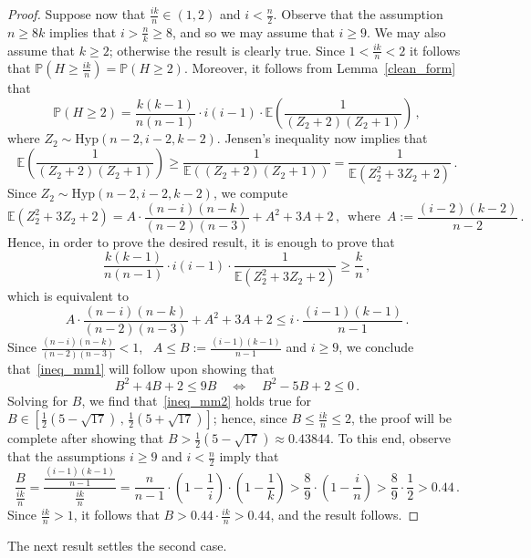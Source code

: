 \documentclass[10pt]{article}
\theoremstyle{plain}
\theoremstyle{definition}
\theoremstyle{remark}
\begin{document}
\begin{proof}
Suppose now that $\frac{ik}{n} \in (1,2)$ and $i<\frac{n}{2}$. 
Observe that the assumption $n\ge 8k$ implies that $i> \frac{n}{k} \ge 8$, and so we may assume that $i\ge 9$. 
We may also assume that $k\ge 2$; otherwise the result is clearly true. 
Since $1<\frac{ik}{n} < 2$ it follows that 
$\mathbb{P}(H \ge \frac{ik}{n})=\mathbb{P}(H\ge 2)$. 
Moreover, it follows from Lemma~\ref{clean_form} that 
\[
\mathbb{P}(H\ge 2) = \frac{k(k-1)}{n(n-1)} \cdot i(i-1)\cdot \mathbb{E}\left(\frac{1}{(Z_2+2)(Z_2+1)}\right) \, ,
\]
where $Z_2\sim\text{Hyp}(n-2,i-2,k-2)$. 
Jensen's inequality now implies that 
\[
\mathbb{E}\left(\frac{1}{(Z_2+2)(Z_2+1)}\right) \ge 
\frac{1}{\mathbb{E}((Z_2+2)(Z_2+1))} = \frac{1}{\mathbb{E}(Z_2^2+3Z_2 +2)} \, .
\]
Since $Z_2\sim\text{Hyp}(n-2,i-2,k-2)$, we compute 
\[
\mathbb{E}(Z_2^2+3Z_2 +2) = A \cdot 
\frac{(n-i)(n-k)}{(n-2)(n-3)} + A^2 + 3A + 2 \, , \, \text{ where } \, A := \frac{(i-2)(k-2)}{n-2} \, .
\]
Hence, in order to prove the desired result, it is enough to prove that 
\[
\frac{k(k-1)}{n(n-1)} \cdot i(i-1)\cdot \frac{1}{\mathbb{E}(Z_2^2+3Z_2 +2)} \ge \frac{k}{n} \, ,
\]
which is equivalent to
\begin{equation}\label{ineq_mm1}
A \cdot 
\frac{(n-i)(n-k)}{(n-2)(n-3)} + A^2 + 3A + 2 \le i\cdot \frac{(i-1)(k-1)}{n-1} \, .
\end{equation}
Since $\frac{(n-i)(n-k)}{(n-2)(n-3)}<1$, \, $A\le B:=\frac{(i-1)(k-1)}{n-1}$ and $i\ge 9$, we conclude that~\eqref{ineq_mm1} will follow upon showing that 
\begin{equation}\label{ineq_mm2}
B^2 +4B + 2 \le 9B \quad \Longleftrightarrow\quad B^2-5B+2 \le 0 \, .
\end{equation}
Solving for $B$, we find that~\eqref{ineq_mm2} holds true for $B\in \left[\frac{1}{2}(5-\sqrt{17})\, ,\, \frac{1}{2}(5+\sqrt{17})\right]$; hence, since $B\le \frac{ik}{n}\le 2$, the proof will be complete after showing that $B > \frac{1}{2}(5-\sqrt{17})\approx 0.43844$. 
To this end, observe that the assumptions $i\ge 9$ and $i<\frac{n}{2}$ imply that 
\[
\frac{B}{\frac{ik}{n}}=\frac{\frac{(i-1)(k-1)}{n-1}}{\frac{ik}{n}} = \frac{n}{n-1} \cdot \left(1-\frac{1}{i}\right)\cdot \left(1-\frac{1}{k}\right) > \frac{8}{9}\cdot \left(1-\frac{i}{n}\right) >\frac{8}{9}\cdot\frac{1}{2} > 0.44 \, .
\]
Since  $\frac{ik}{n}>1$, it follows that $B > 0.44 \cdot \frac{ik}{n} > 0.44$,  and the result follows. 
\end{proof}

The next result settles the second case. 
\end{document}

